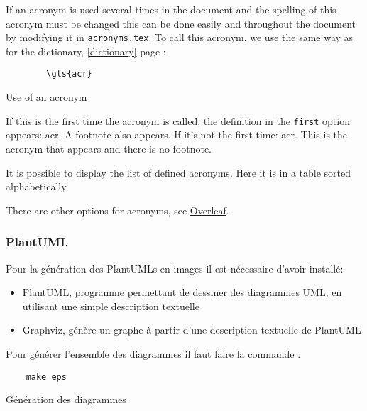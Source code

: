If an acronym is used several times in the document and the spelling of this acronym must be changed
this can be done easily and throughout the document by modifying it in \verb=acronyms.tex=.
To call this acronym, we use the same way as for the dictionary, \ref{dictionary} page \pageref{dictionary} :
\begin{code}
    \begin{verbatim}
        \gls{acr}
\end{verbatim}
    \caption{Use of an acronym}
\end{code}

If this is the first time the acronym is called, the definition in the \verb=first= option appears: \gls{acr}.
A footnote also appears. \newline
If it's not the first time: \gls{acr}. This is the acronym that appears and there is no footnote. \newline

It is possible to display the list of defined acronyms. Here it is in a table sorted alphabetically.

\printglossary[type=\acronymtype,style=superheaderborder ,title={Definitions, acronyms and abbreviations}]
\glsaddallunused \newline %

There are other options for acronyms, see \href{https://fr.overleaf.com/learn/latex/Glossaries}{Overleaf}.

\subsubsection{PlantUML}
Pour la génération des PlantUMLs en images il est nécessaire d'avoir installé:
\begin{itemize}
    \item PlantUML, programme permettant de dessiner des diagrammes UML, en utilisant une simple description textuelle
    \item Graphviz, génère un graphe à partir d'une description textuelle de PlantUML
\end{itemize}

Pour générer l'ensemble des diagrammes il faut faire la commande :
\begin{code}
    \begin{verbatim}
    make eps
\end{verbatim}
    \caption{Génération des diagrammes}
\end{code}

